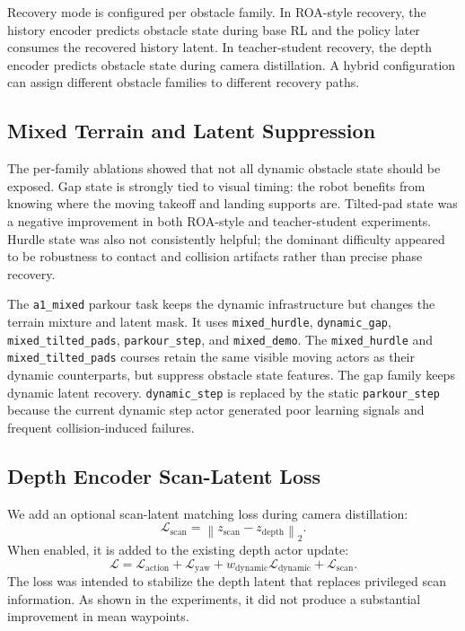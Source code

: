 \documentclass[conference]{IEEEtran}
\begin{document}
Recovery mode is configured per obstacle family. In ROA-style recovery, the history encoder predicts obstacle state during base RL and the policy later consumes the recovered history latent. In teacher-student recovery, the depth encoder predicts obstacle state during camera distillation. A hybrid configuration can assign different obstacle families to different recovery paths.

\subsection{Mixed Terrain and Latent Suppression}
The per-family ablations showed that not all dynamic obstacle state should be exposed. Gap state is strongly tied to visual timing: the robot benefits from knowing where the moving takeoff and landing supports are. Tilted-pad state was a negative improvement in both ROA-style and teacher-student experiments. Hurdle state was also not consistently helpful; the dominant difficulty appeared to be robustness to contact and collision artifacts rather than precise phase recovery.

The \texttt{a1\_\allowbreak mixed} parkour task keeps the dynamic infrastructure but changes the terrain mixture and latent mask. It uses \texttt{mixed\_\allowbreak hurdle}, \texttt{dynamic\_\allowbreak gap}, \texttt{mixed\_\allowbreak tilted\_\allowbreak pads}, \texttt{parkour\_\allowbreak step}, and \texttt{mixed\_\allowbreak demo}. The \texttt{mixed\_\allowbreak hurdle} and \texttt{mixed\_\allowbreak tilted\_\allowbreak pads} courses retain the same visible moving actors as their dynamic counterparts, but suppress obstacle state features. The gap family keeps dynamic latent recovery. \texttt{dynamic\_\allowbreak step} is replaced by the static \texttt{parkour\_\allowbreak step} because the current dynamic step actor generated poor learning signals and frequent collision-induced failures.

\subsection{Depth Encoder Scan-Latent Loss}
We add an optional scan-latent matching loss during camera distillation:
\[\mathcal L_{\mathrm{scan}}=\left\|z_{\mathrm{scan}}-z_{\mathrm{depth}}\right\|_2.\]
When enabled, it is added to the existing depth actor update:
\[\mathcal L=\mathcal L_{\mathrm{action}}+\mathcal L_{\mathrm{yaw}}+w_{\mathrm{dynamic}}\mathcal L_{\mathrm{dynamic}}+\mathcal L_{\mathrm{scan}}.\]
The loss was intended to stabilize the depth latent that replaces privileged scan information. As shown in the experiments, it did not produce a substantial improvement in mean waypoints.
\end{document}
